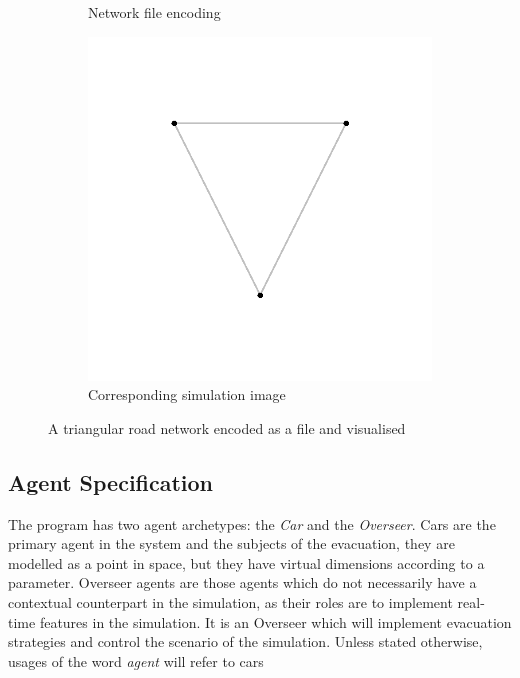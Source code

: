 \begin{figure}
    \centering
    \begin{subfigure}[b]{0.3\textwidth}
        \centering
         \small{}
         \caption{Network file encoding}
         \label{fig:example_network_file}
    \end{subfigure}
    \begin{subfigure}[b]{0.5\textwidth}
        \centering
         \includegraphics[width=\textwidth]{images/ExampleNetwork.png}
         \caption{Corresponding simulation image}
         \label{fig:example_network_vis}
    \end{subfigure}
    \caption{A triangular road network encoded as a file and visualised}
    \label{fig:example_network}
\end{figure}

\subsection{Agent Specification}
The program has two agent archetypes: the \textit{Car} and the \textit{Overseer}. Cars are the primary agent in the system and the subjects of the evacuation, they are modelled as a point in space, but they have virtual dimensions according to a parameter. Overseer agents are those agents which do not necessarily have a contextual counterpart in the simulation, as their roles are to implement real-time features in the simulation. It is an Overseer which will implement evacuation strategies and control the scenario of the simulation. Unless stated otherwise, usages of the word \textit{agent} will refer to cars

